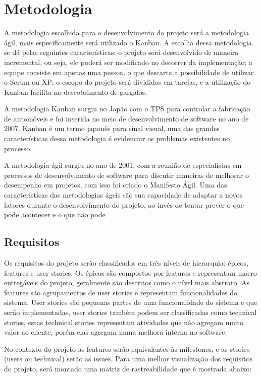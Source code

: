 \chapter*[Metodologia]{Metodologia}
A metodologia escolhida para o desenvolvimento do projeto será a metodologia ágil, mais especificamente será utilizado o Kanban. A escolha dessa metodologia se dá pelas seguintes características: o projeto será desenvolvido de maneira incremental, ou seja, ele poderá ser modificado no decorrer da implementação; a equipe consiste em apenas uma pessoa, o que descarta a possibilidade de utilizar o Scrum ou XP; o escopo do projeto será divididos em tarefas, e a utilização do Kanban facilita no descobrimento de gargalos.

A metodologia Kanban surgiu no Japão com o TPS\cite{tps} para controlar a fabricação de automóveis e foi inserida no meio de desenvolvimento de software no ano de 2007. Kanban é um termo japonês para sinal visual, uma das grandes características dessa metodologia é evidenciar os problemas existentes no processo. 

A metodologia ágil surgiu no ano de 2001, com a reunião de especialistas em processos de desenvolvimento de software para discutir maneiras de melhorar o desempenho em projetos, com isso foi criado o Manifesto Ágil. Uma das características das metodologias ágeis são sua capacidade de adaptar a novos fatores durante o desenvolvimento do projeto, ao invés de tentar prever o que pode acontecer e o que não pode
\section*{Requisitos}
Os requisitos do projeto serão classificados em três níveis de hierarquia:  épicos, features e user stories. Os épicos são compostos por features e representam macro entregáveis do projeto, geralmente são descritos como o nível mais abstrato. As features são agrupamentos de user stories e representam funcionalidades do sistema. User stories são pequenas partes de uma funcionalidade do sistema e que serão implementadas, user stories também podem ser classificadas como technical stories, estas technical stories representam atividades que não agregam muito valor ao cliente, porém elas agregam numa melhora interna no software.

No contexto do projeto as features serão equivalentes às milestones, e as stories (users ou technical) serão as issues. Para uma melhor visualização dos requisitos do projeto, será montado uma matriz de rastreabilidade que é mostrada abaixo:
